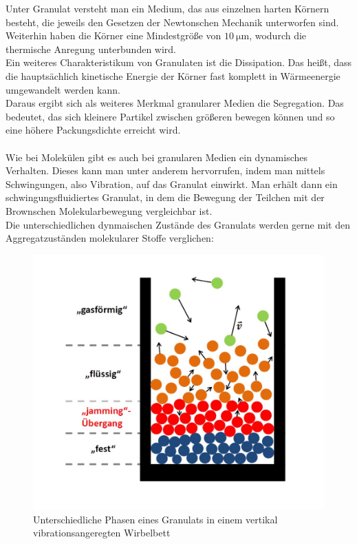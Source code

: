 Unter Granulat versteht man ein Medium, das aus einzelnen harten Körnern besteht, die jeweils den Gesetzen der Newtonschen Mechanik unterworfen sind. Weiterhin haben die Körner eine Mindestgröße von $\SI{10}{\micro\meter}$, wodurch die thermische Anregung unterbunden wird. \\
Ein weiteres Charakteristikum von Granulaten ist die Dissipation. Das heißt, dass die hauptsächlich kinetische Energie der Körner fast komplett in Wärmeenergie umgewandelt werden kann. \cite{DLRWebsite} \\
Daraus ergibt sich als weiteres Merkmal granularer Medien die Segregation. Das bedeutet, das sich kleinere Partikel zwischen größeren bewegen können und so eine höhere Packungsdichte erreicht wird. \cite{PhysikimKontext} \\
\hfill \\ 
Wie bei Molekülen gibt es auch bei granularen Medien ein dynamisches Verhalten. Dieses kann man unter anderem hervorrufen, indem man mittels Schwingungen, also Vibration, auf das Granulat einwirkt. Man erhält dann ein schwingungsfluidiertes Granulat, in dem die Bewegung der Teilchen mit der Brownschen Molekularbewegung vergleichbar ist. \\
Die unterschiedlichen dynmaischen Zustände des Granulats werden gerne mit den Aggregatzuständen molekularer Stoffe verglichen:


\begin{center}
\begin{figure}[h]
	\includegraphics[scale=0.45]{Einleitung_1.jpg}
	\caption[Phasen im Wirbelbett]{Unterschiedliche Phasen eines Granulats in einem vertikal vibrationsangeregten Wirbelbett  \cite{Darmstadt2015}}
\end{figure}	
\end{center}

